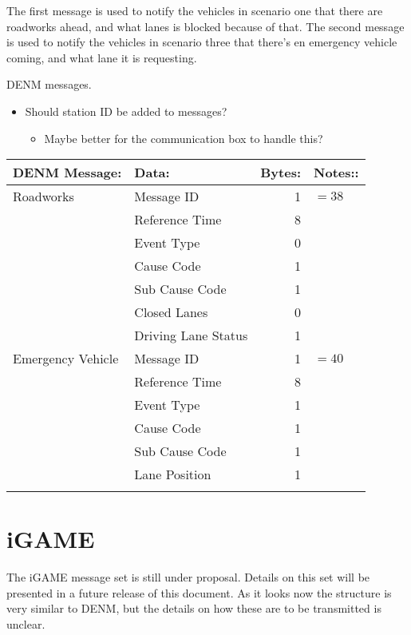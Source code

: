 \documentclass[11pt]{article}
\begin{document}
The first message is used to notify the vehicles in scenario one that
there are roadworks ahead, and what lanes is blocked because of that.
The second message is used to notify the vehicles in scenario three
that there's en emergency vehicle coming, and what lane it is
requesting.


DENM messages.
\begin{itemize}
\item Should station ID be added to messages?
\begin{itemize}
\item Maybe better for the communication box to handle this?
\end{itemize}
\end{itemize}
\begin{center}
\begin{tabular}{llrl}
\hline
DENM Message: & Data: & Bytes: & Notes::\\
\hline
Roadworks & Message ID & 1 & \(=38\)\\
 & Reference Time & 8 & \\
 & Event Type & 0 & \\
 & Cause Code & 1 & \\
 & Sub Cause Code & 1 & \\
 & Closed Lanes & 0 & \\
 & Driving Lane Status & 1 & \\
\hline
Emergency Vehicle & Message ID & 1 & \(=40\)\\
 & Reference Time & 8 & \\
 & Event Type & 1 & \\
 & Cause Code & 1 & \\
 & Sub Cause Code & 1 & \\
 & Lane Position & 1 & \\
 &  &  & \\
\end{tabular}
\end{center}



\section{iGAME}
\label{sec:orgheadline4}
The iGAME message set is still under proposal. Details on this set
will be presented in a future release of this document. As it looks
now the structure is very similar to DENM, but the details on how
these are to be transmitted is unclear.
\end{document}
